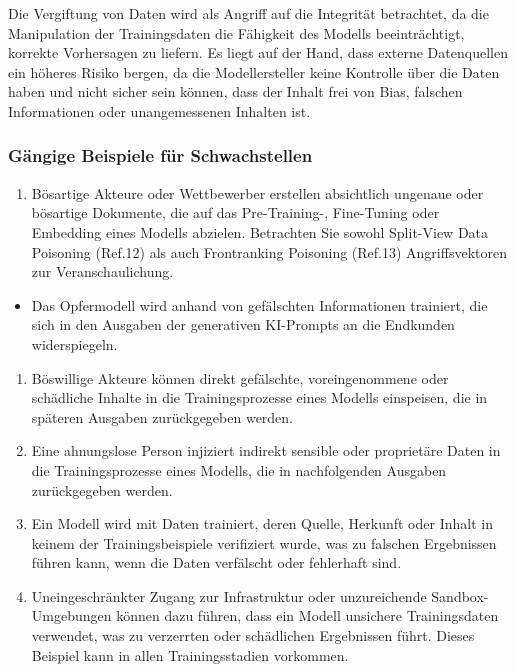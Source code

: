 \documentclass[
]{article}
\providecommand{\tightlist}{%
  \setlength{\itemsep}{0pt}\setlength{\parskip}{0pt}}
\begin{document}
Die Vergiftung von Daten wird als Angriff auf die Integrität betrachtet,
da die Manipulation der Trainingsdaten die Fähigkeit des Modells
beeinträchtigt, korrekte Vorhersagen zu liefern. Es liegt auf der Hand,
dass externe Datenquellen ein höheres Risiko bergen, da die
Modellersteller keine Kontrolle über die Daten haben und nicht sicher
sein können, dass der Inhalt frei von Bias, falschen Informationen oder
unangemessenen Inhalten ist.

\subsubsection{Gängige Beispiele für
Schwachstellen}\label{guxe4ngige-beispiele-fuxfcr-schwachstellen}

\begin{enumerate}
\def\labelenumi{\arabic{enumi}.}
\tightlist
\item
  Bösartige Akteure oder Wettbewerber erstellen absichtlich ungenaue
  oder bösartige Dokumente, die auf das Pre-Training-, Fine-Tuning oder
  Embedding eines Modells abzielen. Betrachten Sie sowohl Split-View
  Data Poisoning (Ref.12) als auch Frontranking Poisoning (Ref.13)
  Angriffsvektoren zur Veranschaulichung.
\end{enumerate}

\begin{itemize}
\tightlist
\item
  Das Opfermodell wird anhand von gefälschten Informationen trainiert,
  die sich in den Ausgaben der generativen KI-Prompts an die Endkunden
  widerspiegeln.
\end{itemize}

\begin{enumerate}
\def\labelenumi{\arabic{enumi}.}
\setcounter{enumi}{1}
\tightlist
\item
  Böswillige Akteure können direkt gefälschte, voreingenommene oder
  schädliche Inhalte in die Trainingsprozesse eines Modells einspeisen,
  die in späteren Ausgaben zurückgegeben werden.
\item
  Eine ahnungslose Person injiziert indirekt sensible oder proprietäre
  Daten in die Trainingsprozesse eines Modells, die in nachfolgenden
  Ausgaben zurückgegeben werden.
\item
  Ein Modell wird mit Daten trainiert, deren Quelle, Herkunft oder
  Inhalt in keinem der Trainingsbeispiele verifiziert wurde, was zu
  falschen Ergebnissen führen kann, wenn die Daten verfälscht oder
  fehlerhaft sind.
\item
  Uneingeschränkter Zugang zur Infrastruktur oder unzureichende
  Sandbox-Umgebungen können dazu führen, dass ein Modell unsichere
  Trainingsdaten verwendet, was zu verzerrten oder schädlichen
  Ergebnissen führt. Dieses Beispiel kann in allen Trainingsstadien
  vorkommen.
\end{enumerate}
\end{document}
